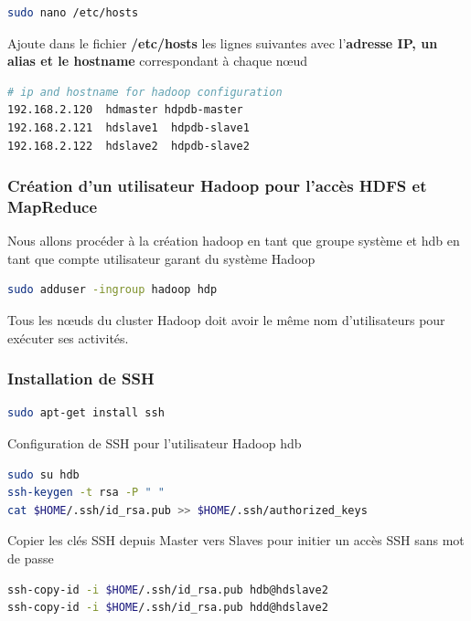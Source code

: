 \documentclass[12pt,french]{book}
\begin{document}
\begin{lstlisting}[language=bash, frame=single]
sudo nano /etc/hosts
\end{lstlisting}

Ajoute dans le fichier \textbf{/etc/hosts} les lignes suivantes avec l’\textbf{adresse IP, un alias et le hostname} correspondant à chaque nœud

\begin{lstlisting}[language=bash, frame=single]
# ip and hostname for hadoop configuration
192.168.2.120  hdmaster hdpdb-master
192.168.2.121  hdslave1  hdpdb-slave1
192.168.2.122  hdslave2  hdpdb-slave2
\end{lstlisting}

\subsubsection{Création d’un utilisateur Hadoop pour l’accès HDFS et MapReduce}

Nous allons procéder à la création hadoop en tant que groupe système et hdb en tant que compte utilisateur garant du système Hadoop

\begin{lstlisting}[language=bash, frame=single]
sudo adduser -ingroup hadoop hdp
\end{lstlisting}

Tous les nœuds du cluster Hadoop doit avoir le même nom d’utilisateurs pour exécuter ses activités.

\subsubsection{Installation de SSH}

\begin{lstlisting}[language=bash, frame=single]
sudo apt-get install ssh
\end{lstlisting}

Configuration de SSH pour l’utilisateur Hadoop hdb


\begin{lstlisting}[language=bash, frame=single]
sudo su hdb
ssh-keygen -t rsa -P " "
cat $HOME/.ssh/id_rsa.pub >> $HOME/.ssh/authorized_keys
\end{lstlisting}

Copier les clés SSH depuis Master vers Slaves pour initier un accès SSH sans mot de passe 

\begin{lstlisting}[language=bash, frame=single]
ssh-copy-id -i $HOME/.ssh/id_rsa.pub hdb@hdslave2
ssh-copy-id -i $HOME/.ssh/id_rsa.pub hdd@hdslave2
\end{lstlisting}
\end{document}
